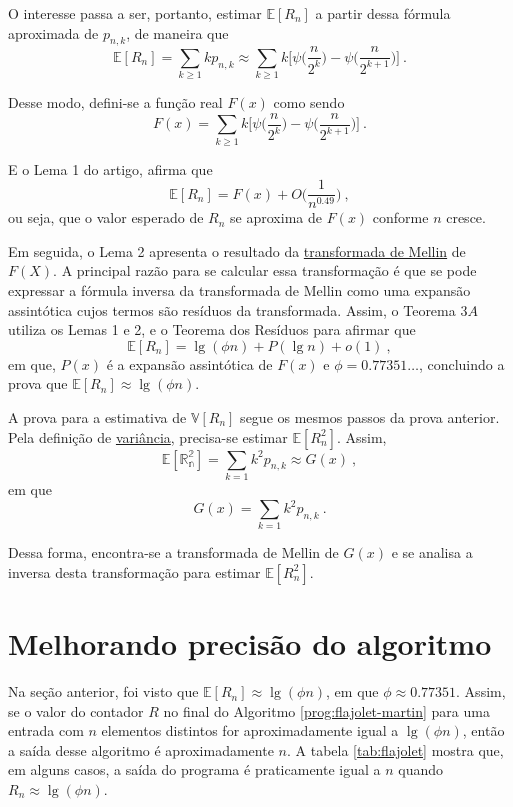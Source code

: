 O interesse passa a ser, portanto, estimar $\mathbb{E}[R_n]$ a partir dessa fórmula aproximada de $p_{n,k}$, de maneira 
que 
\[ \mathbb{E}[R_n] = \sum_{k \geq 1} k p_{n,k} \approx \sum_{k \geq 1} k \Big[ \psi \Big( \frac{n}{2^k} \Big) - \psi 
  \Big( \frac{n}{2^{k+1}} \Big) \Big] \ . \]

Desse modo, defini-se a função real $F(x)$ como sendo
\[ F(x) =  \sum_{k \geq 1} k \Big[ \psi \Big( \frac{n}{2^k} \Big) - \psi \Big( \frac{n}{2^{k+1}} \Big) \Big] \ . \]

E o Lema 1 do artigo, afirma que 
\[ \mathbb{E}[R_n] = F(x) + O \Big( \frac{1}{n^{0.49}} \Big) \ , \]
ou seja, que o valor esperado de $R_n$ se aproxima de $F(x)$ conforme $n$ cresce.

Em seguida, o Lema 2 apresenta o resultado da \hyperref[ap:mellin]{transformada de Mellin} de $F(X)$. A principal razão 
para se calcular essa transformação é que se pode expressar a fórmula inversa da transformada de Mellin como uma 
expansão assintótica cujos termos são resíduos da transformada. Assim, o Teorema $3A$ utiliza os Lemas 1 e 2, e o 
Teorema dos Resíduos para afirmar que 
\[ \mathbb{E}[R_n] = \lg (\phi n) + P(\lg n) + o(1) \ , \]
em que, $P(x)$ é a expansão assintótica de $F(x)$ e $\phi = 0.77351\dots$, concluindo a prova que 
$\mathbb{E}[R_n] \approx \lg (\phi n)$.

A prova para a estimativa de $\mathbb{V}[R_n]$ segue os mesmos passos da prova anterior. Pela definição de 
\hyperref[ap:variance]{variância}, precisa-se estimar $\mathbb{E}[R_n ^ 2]$. Assim, 
\[ \mathbb{E[R_n ^2]} = \sum_{k=1} k^2 p_{n,k} \approx G(x) \ , \]
em que
\[ G(x) = \sum_{k=1} k^2 p_{n,k} \ . \]

Dessa forma, encontra-se a transformada de Mellin de $G(x)$ e se analisa a inversa desta transformação para estimar 
$\mathbb{E}[R_n^2]$.

\section{Melhorando precisão do algoritmo}

Na seção anterior, foi visto que $\mathbb{E}[R_n] \approx \lg(\phi n)$, em que $\phi \approx 0.77351$. Assim, se o valor 
do contador $R$ no final do Algoritmo \ref{prog:flajolet-martin} para uma entrada com $n$ elementos distintos for 
aproximadamente igual a $\lg(\phi n)$, então a saída desse algoritmo é aproximadamente $n$. A tabela \ref{tab:flajolet} 
mostra que, em alguns casos, a saída do programa é praticamente igual a $n$ quando $R_n \approx \lg(\phi n)$.

